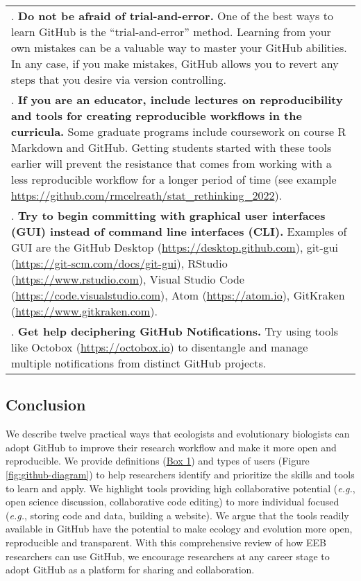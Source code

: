 \begin{tablenos:no-prefix-table-caption}
\begin{longtable}[]{@{}
  >{\raggedright\arraybackslash}p{}@{}}
7. \textbf{Do not be afraid of trial-and-error.} One of the best ways to learn GitHub is the ``trial-and-error'' method. Learning from your own mistakes can be a valuable way to master your GitHub abilities. In any case, if you make mistakes, GitHub allows you to revert any steps that you desire via version controlling. \\
8. \textbf{If you are an educator, include lectures on reproducibility and tools for creating reproducible workflows in the curricula.} Some graduate programs include coursework on course R Markdown and GitHub. Getting students started with these tools earlier will prevent the resistance that comes from working with a less reproducible workflow for a longer period of time (see example \url{https://github.com/rmcelreath/stat_rethinking_2022}). \\
9. \textbf{Try to begin committing with graphical user interfaces (GUI) instead of command line interfaces (CLI).} Examples of GUI are the GitHub Desktop (\url{https://desktop.github.com}), git-gui (\url{https://git-scm.com/docs/git-gui}), RStudio (\url{https://www.rstudio.com}), Visual Studio Code (\url{https://code.visualstudio.com}), Atom (\url{https://atom.io}), GitKraken (\url{https://www.gitkraken.com}). \\
10. \textbf{Get help deciphering GitHub Notifications.} Try using tools like Octobox (\url{https://octobox.io}) to disentangle and manage multiple notifications from distinct GitHub projects. \\
\bottomrule
\end{longtable}

\end{tablenos:no-prefix-table-caption}

\hypertarget{conclusion}{%
\subsection{Conclusion}\label{conclusion}}

We describe twelve practical ways that ecologists and evolutionary biologists can adopt GitHub to improve their research workflow and make it more open and reproducible.
We provide definitions (\protect\hyperlink{definitions}{Box 1}) and types of users (Figure \ref{fig:github-diagram}) to help researchers identify and prioritize the skills and tools to learn and apply.
We highlight tools providing high collaborative potential (\emph{e.g.}, open science discussion, collaborative code editing) to more individual focused (\emph{e.g.}, storing code and data, building a website).
We argue that the tools readily available in GitHub have the potential to make ecology and evolution more open, reproducible and transparent.
With this comprehensive review of how EEB researchers can use GitHub, we encourage researchers at any career stage to adopt GitHub as a platform for sharing and collaboration.

